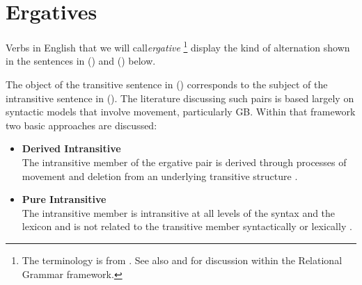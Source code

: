 \chapter{Ergatives}
\label{ergatives}

Verbs in English that we will call{\it ergative} \footnote {The terminology is
from \cite{Burzio86}. See also \cite{Perlmutter78} and \cite{Rosen81} for
discussion within the Relational Grammar framework.} display the kind of
alternation shown in the sentences in () and () below.


The object of the transitive sentence in () corresponds to the subject
of the intransitive sentence in (). The literature discussing such pairs
is based largely on syntactic models that involve movement, particularly GB.
Within that framework two basic approaches are discussed:

\begin{itemize}
\item {\bf Derived Intransitive}\\ The intransitive member of the
ergative pair is derived through processes of movement and deletion from an
underlying transitive structure \cite{Burzio86,HaleKeyser86,HaleKeyser87}.

\item {\bf Pure Intransitive}\\ The intransitive member is intransitive at all levels of the
syntax and the lexicon and is not related to the transitive member
syntactically or lexically \cite{Napoli88}.
\end{itemize}

